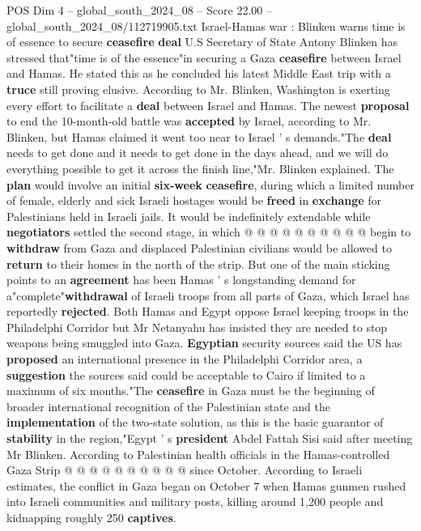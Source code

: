 \begin{textsample}{POS Dim 4 – global\_south\_2024\_08 – Score 22.00 – global\_south\_2024\_08/112719905.txt}  \label{ex:f4_pos_128}
Israel-Hamas war : Blinken warns time is of essence to secure \textbf{ceasefire} \textbf{deal} U.S Secretary of State Antony Blinken has stressed that"time is of the essence"in securing a Gaza \textbf{ceasefire} between Israel and Hamas.
He stated this as he concluded his latest Middle East trip with a \textbf{truce} still proving elusive.
According to Mr.
Blinken, Washington is exerting every effort to facilitate a \textbf{deal} between Israel and Hamas.
The newest \textbf{proposal} to end the 10-month-old battle was \textbf{accepted} by Israel, according to Mr.
Blinken, but Hamas claimed it went too near to Israel ' s demands."The \textbf{deal} needs to get done and it needs to get done in the days ahead, and we will do everything possible to get it across the finish line,"Mr.
Blinken explained.
The \textbf{plan} would involve an initial \textbf{six-week} \textbf{ceasefire}, during which a limited number of female, elderly and sick Israeli hostages would be \textbf{freed} in \textbf{exchange} for Palestinians held in Israeli jails.
It would be indefinitely extendable while \textbf{negotiators} settled the second stage, in which @ @ @ @ @ @ @ @ @ @ begin to \textbf{withdraw} from Gaza and displaced Palestinian civilians would be allowed to \textbf{return} to their homes in the north of the strip.
But one of the main sticking points to an \textbf{agreement} has been Hamas ' s longstanding demand for a"complete"\textbf{withdrawal} of Israeli troops from all parts of Gaza, which Israel has reportedly \textbf{rejected}.
Both Hamas and Egypt oppose Israel keeping troops in the Philadelphi Corridor but Mr Netanyahu has insisted they are needed to stop weapons being smuggled into Gaza. \textbf{Egyptian} security sources said the US has \textbf{proposed} an international presence in the Philadelphi Corridor area, a \textbf{suggestion} the sources said could be acceptable to Cairo if limited to a maximum of six months."The \textbf{ceasefire} in Gaza must be the beginning of broader international recognition of the Palestinian state and the \textbf{implementation} of the two-state solution, as this is the basic guarantor of \textbf{stability} in the region,"Egypt ' s \textbf{president} Abdel Fattah Sisi said after meeting Mr Blinken.
According to Palestinian health officials in the Hamas-controlled Gaza Strip @ @ @ @ @ @ @ @ @ @ since October.
According to Israeli estimates, the conflict in Gaza began on October 7 when Hamas gunmen rushed into Israeli communities and military posts, killing around 1,200 people and kidnapping roughly 250 \textbf{captives}.

\end{textsample}
